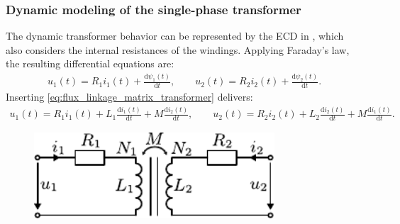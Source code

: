 \begin{frame}
	\frametitle{Dynamic modeling of the single-phase transformer}
		The dynamic transformer behavior can be represented by the ECD in , which also considers the internal resistances of the windings. Applying Faraday's law, the resulting differential equations are:
		\begin{align}
			u_1(t) = R_1 i_1(t) + \frac{\mathrm{d}\psi_1(t)}{\mathrm{d}t}, \qquad u_2(t) = R_2 i_2(t) + \frac{\mathrm{d}\psi_2(t)}{\mathrm{d}t}. \label{eq:transformer_differential_equations}
		\end{align} \pause
		Inserting \eqref{eq:flux_linkage_matrix_transformer} delivers:
		\begin{align}
			u_1(t) = R_1 i_1(t) + L_1 \frac{\mathrm{d}i_1(t)}{\mathrm{d}t} + M \frac{\mathrm{d}i_2(t)}{\mathrm{d}t}, \qquad
			u_2(t) = R_2 i_2(t) + L_2 \frac{\mathrm{d}i_2(t)}{\mathrm{d}t} + M \frac{\mathrm{d}i_1(t)}{\mathrm{d}t}. \label{eq:transformer_differential_equations_2}
		\end{align}
\begin{figure}
\begin{columns}
	\begin{column}{0.55\textwidth}
            \centering
            \includegraphics[width=0.8\textwidth]{fig/lec04/General_transformer_ECD.pdf}
    \end{column}
\end{columns}
\end{figure}
\end{frame}

